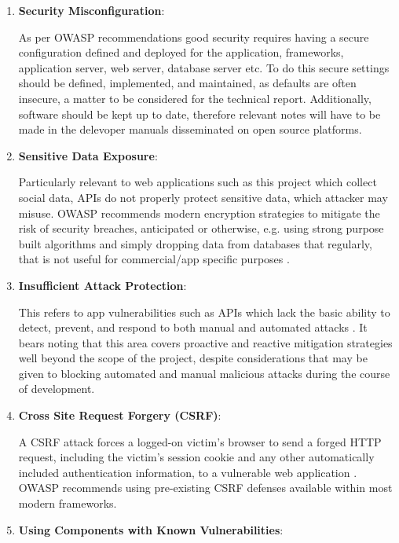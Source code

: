 \begin{enumerate}
    \item \textbf{Security Misconfiguration}:
    
    As per OWASP \cite{OWASP2017} recommendations good security requires having a secure configuration defined and deployed for the application, frameworks, application server, web server, database server etc. To do this secure settings should be defined, implemented, and maintained, as defaults are often insecure, a matter to be considered for the technical report. Additionally, software should be kept up to date\cite{OWASP2017}, therefore relevant notes will have to be made in the delevoper manuals disseminated on open source platforms.
    
    \item \textbf{Sensitive Data Exposure}:
    
    Particularly relevant to web applications such as this project which collect social data, APIs do not properly protect sensitive data, which attacker may misuse. OWASP recommends modern encryption strategies to mitigate the risk of security breaches, anticipated or otherwise, e.g. using strong purpose built algorithms and simply dropping data from databases that regularly, that is not useful for commercial/app specific purposes \cite{OWASP2017}.
    
    \item \textbf{Insufficient Attack Protection}:
    
    This refers to app vulnerabilities such as APIs which lack the basic ability to detect, prevent, and respond to both manual and automated attacks \cite{OWASP2017}. It bears noting that this area covers proactive and reactive mitigation strategies well beyond the scope of the project, despite considerations that may be given to blocking automated and manual malicious attacks during the course of development.
    
    \item \textbf{Cross Site Request Forgery (CSRF)}:
    
    A CSRF attack forces a logged-on victim's browser to send a forged HTTP request, including the victim’s session cookie and any other automatically included authentication information, to a vulnerable web application \cite{OWASP2017}. OWASP recommends using pre-existing CSRF defenses available within most modern frameworks.
    
    \item \textbf{Using Components with Known Vulnerabilities}:
    

\end{enumerate}
